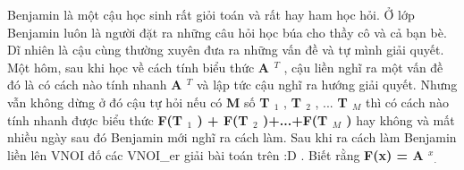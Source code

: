 Benjamin là một cậu học sinh rất giỏi toán và rất hay ham học hỏi. Ở lớp Benjamin luôn là người đặt ra những câu hỏi học búa cho thầy cô và cả bạn bè. Dĩ nhiên là cậu cùng thường xuyên đưa ra những vấn đề và tự mình giải quyết. Một hôm, sau khi học về cách tính biểu thức   \textbf{    A    $^     T    $}   , cậu liền nghĩ ra một vấn đề đó là có cách nào tính nhanh   \textbf{    A    $^     T    $}   và lập tức cậu nghĩ ra hướng giải quyết. Nhưng vẫn không dừng ở đó cậu tự hỏi nếu có   \textbf{    M   }   số   \textbf{    T    $_     1    $}   ,   \textbf{    T    $_     2    $}   , ...   \textbf{    T    $_     M    $}   thì có cách nào tính nhanh được biểu thức   \textbf{    F(T    $_     1    $    ) + F(T    $_     2    $    )+...+F(T    $_     M    $    )   }   hay không và mất nhiều ngày sau đó Benjamin mới nghĩ ra cách làm. Sau khi ra cách làm Benjamin liền lên VNOI đố các VNOI\_er giải bài toán trên :D . Biết rằng   \textbf{    F(x) = A    $^     x    $}$_    .   $